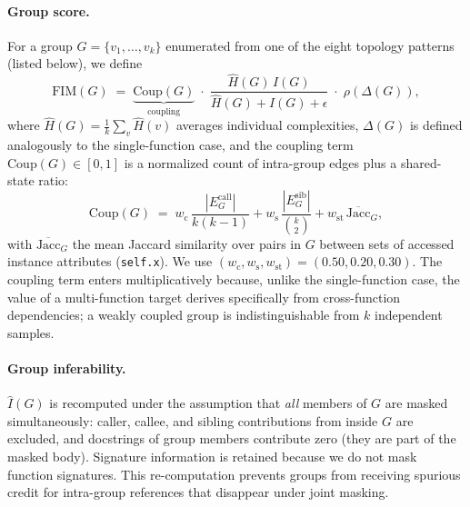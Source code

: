 \paragraph{Group score.}
For a group $G = \{v_1, \dots, v_k\}$ enumerated from one of the eight
topology patterns (listed below), we define
%
\begin{equation}
  \mathrm{FIM}(G) \;=\;
  \underbrace{\mathrm{Coup}(G)}_{\text{coupling}}
  \;\cdot\;
  \frac{\hat{H}(G)\,\hat{I}(G)}{\hat{H}(G) + \hat{I}(G) + \epsilon}
  \;\cdot\;
  \rho\!\left(\Delta(G)\right),
  \label{eq:fim_group}
\end{equation}
%
where $\hat{H}(G) = \tfrac{1}{k}\sum_v \hat{H}(v)$ averages individual
complexities, $\Delta(G)$ is defined analogously to the single-function
case, and the coupling term $\mathrm{Coup}(G) \in [0, 1]$ is a normalized
count of intra-group edges plus a shared-state ratio:
%
\begin{equation}
  \mathrm{Coup}(G)
  \;=\; w_{\mathrm{c}}\,\frac{|E^{\text{call}}_G|}{k(k\!-\!1)}
   + w_{\mathrm{s}}\,\frac{|E^{\text{sib}}_G|}{\binom{k}{2}}
   + w_{\mathrm{st}}\,\overline{\mathrm{Jacc}}_G,
  \label{eq:coupling}
\end{equation}
%
with $\overline{\mathrm{Jacc}}_G$ the mean Jaccard similarity over pairs in
$G$ between sets of accessed instance attributes (\texttt{self.x}). We use
$(w_{\mathrm{c}}, w_{\mathrm{s}}, w_{\mathrm{st}}) = (0.50, 0.20, 0.30)$.
The coupling term enters multiplicatively because, unlike the
single-function case, the value of a multi-function target derives
specifically from cross-function dependencies; a weakly coupled group is
indistinguishable from $k$ independent samples.

\paragraph{Group inferability.}
$\hat{I}(G)$ is recomputed under the assumption that \emph{all} members of
$G$ are masked simultaneously: caller, callee, and sibling contributions
from inside $G$ are excluded, and docstrings of group members contribute
zero (they are part of the masked body). Signature information is retained
because we do not mask function signatures. This re-computation prevents
groups from receiving spurious credit for intra-group references that
disappear under joint masking.

